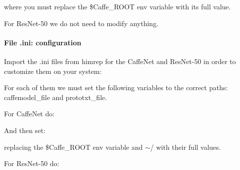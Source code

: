 \begin{DoxyCode}{0}
\end{DoxyCode}


where you must replace the {\ttfamily \$\+Caffe\+\_\+\+R\+O\+OT} env variable with its full value.

For {\ttfamily Res\+Net-\/50} we do not need to modify anything.

\paragraph*{File .ini\+: configuration}

Import the {\ttfamily .ini} files from {\ttfamily himrep} for the {\ttfamily Caffe\+Net} and {\ttfamily Res\+Net-\/50} in order to customize them on your system\+:


\begin{DoxyCode}{0}
\end{DoxyCode}


For each of them we must set the following variables to the correct paths\+: {\ttfamily caffemodel\+\_\+file} and {\ttfamily prototxt\+\_\+file}.

For {\ttfamily Caffe\+Net} do\+:


\begin{DoxyCode}{0}
\end{DoxyCode}


And then set\+:


\begin{DoxyCode}{0}
\end{DoxyCode}


replacing the {\ttfamily \$\+Caffe\+\_\+\+R\+O\+OT} env variable and {\ttfamily $\sim$/} with their full values.

For {\ttfamily Res\+Net-\/50} do\+:


\begin{DoxyCode}{0}
\end{DoxyCode}


